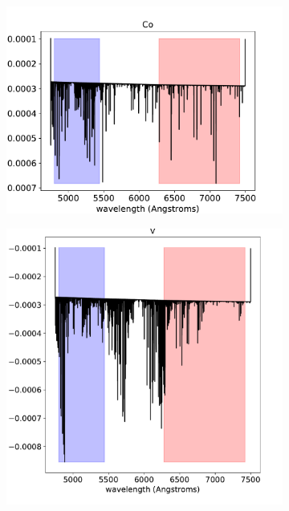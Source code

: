 \documentclass[twocolumn]{aastex631}
\begin{document}
\begin{figure}[ht!]
\begin{subfigure}[b]{0.3\textwidth}
                \end{subfigure}
                \begin{subfigure}[b]{0.3\textwidth}\label{fig:Co-spectrum}
                    \centering
                    \includegraphics[width=\textwidth]{plots/spectra/spectrum.KELT-20b.Co.1.67e-07.inverted-transmission-better.pdf}
                    
                \end{subfigure}
                \begin{subfigure}[b]{0.3\textwidth}\label{fig:V-spectrum}
                    \centering
                    \includegraphics[width=\textwidth]{plots/spectra/spectrum.KELT-20b.V.5.623e-09.inverted-transmission-better.pdf}
                    

\end{subfigure}
\end{figure}
\end{document}
